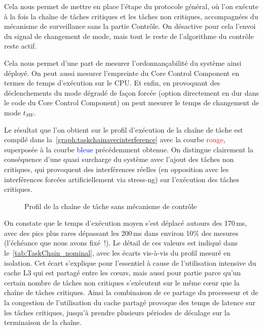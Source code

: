 \documentclass[french, a4paper, 11pt, twoside, pdftex]{StyleThese}
\begin{document}
Cela nous permet de mettre en place l'étape  du protocole général, où l'on exécute à la fois la chaîne de tâches critiques et les tâches non critiques, accompagnées du mécanisme de surveillance sans la partie Contrôle. On désactive pour cela l'envoi du signal de changement de mode, mais tout le reste de l'algorithme du contrôle reste actif.

Cela nous permet d'une part de mesurer l'ordonnançabilité du système ainsi déployé. On peut aussi mesurer l'empreinte du Core Control Component en termes de temps d'exécution sur le CPU. Et enfin, en provoquant des déclenchements du mode dégradé de façon forcée (option directement en dur dans le code du Core Control Component) on peut mesurer le temps de changement de mode $t_{SW}$.

Le résultat que l'on obtient sur le profil d'exécution de la chaîne de tâche est compilé dans la~\autoref{graph:taskchainavecinterference} avec la courbe \textcolor{red}{rouge}, superposée à la courbe \textcolor{blue}{bleue} précédemment obtenue. On distingue clairement la conséquence d'une quasi surcharge du système avec l'ajout des tâches non critiques, qui provoquent des interférences réelles (en opposition avec les interférences forcées artificiellement via stress-ng) sur l'exécution des tâches critiques. %

\begin{figure}[ht]
	\centering
	\scalebox{0.9}{}
   	\captionsetup{justification=centering}
	\caption{Profil de la chaîne de tâche sans mécanisme de contrôle}
	\label{graph:taskchainavecinterference}
\end{figure}

 On constate que le temps d'exécution moyen s'est déplacé autours des 170\,ms, avec des pics plus rares dépassant les 200\,ms dans environ 10\% des mesures (l'échéance que nous avons fixé~!). Le détail de ces valeurs est indiqué dans le~\autoref{tab:TaskChain_nominal}, avec les écarts vis-à-vis du profil mesuré en isolation. Cet écart s'explique pour l'essentiel à cause de l'utilisation intensive du cache L3 qui est partagé entre les cœurs, mais aussi pour partie parce qu'un certain nombre de tâches non critiques s'exécutent sur le même cœur que la chaîne de tâches critiques. Ainsi la combinaison de ce partage du processeur et de la congestion de l'utilisation du cache partagé provoque des temps de latence sur les tâches critiques, jusqu'à prendre plusieurs périodes de décalage sur la terminaison de la chaîne.
 
\end{document}
